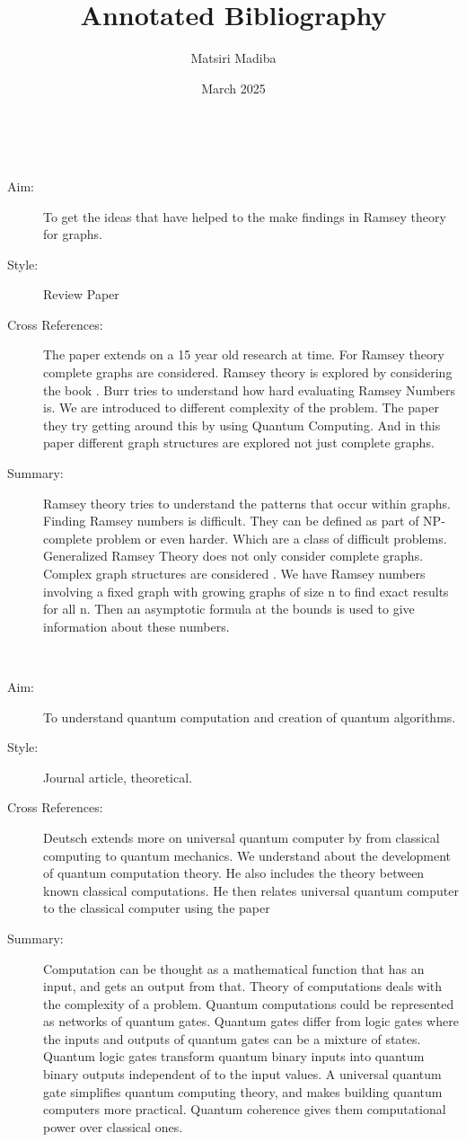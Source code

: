 \documentclass{Assignment}
\author{Matsiri Madiba}
\date{March 2025}
\title{Annotated Bibliography}
\begin{document}
\maketitle
\cite{burr1981generalized}~
\begin{description}
	\item[Aim:]
To get the ideas that have helped to the make findings in Ramsey theory for graphs.
\item[Style:]
Review Paper
\item[Cross References:]
The paper extends on a 15 year old research at time.
For Ramsey theory complete graphs are considered. 
Ramsey theory is explored by considering the book \cite{graham1980ramsey}.
Burr tries to understand how hard evaluating Ramsey Numbers is.
We are introduced to different complexity of the problem.
The paper \cite{PhysRevA.93.032301} they try getting around this by using Quantum Computing.
And in this paper different graph structures are explored not just complete graphs.
\item [Summary:]
Ramsey theory tries to understand the patterns that occur within graphs.
Finding Ramsey numbers is difficult.
They can be defined as part of NP-complete problem or even harder.
Which are a class of difficult problems.
Generalized Ramsey Theory does not only consider complete graphs.
Complex graph structures are considered .
We have Ramsey numbers involving a fixed graph with growing graphs of size n to find exact results for all n. 
Then an asymptotic formula at the bounds is used to give information about these numbers.  
\end{description}
\newpage
\cite{f3197c3a-bce3-3c72-b6d6-c1ee34ac9328}~
	    \begin{description}
			\item [ Aim:]
		To understand quantum computation and creation of quantum algorithms.
		\item[Style:]
		Journal article, theoretical.
		\item[Cross References:]
		Deutsch extends more on universal quantum computer by \cite{deutsch1985quantum} from classical computing to quantum mechanics. 
		We understand about the development of quantum computation theory.
		He also includes the theory between known classical computations. 
		He then relates universal quantum computer to the classical computer using the paper \cite{Turing1936}
		
		\item [Summary:]
		Computation can be thought as a mathematical function that has an input, and gets an output from that.
		Theory of computations deals with the complexity of a problem.
		Quantum computations could be represented as networks of quantum gates.
		Quantum gates differ from logic gates where the inputs and outputs of quantum gates can be a mixture of states.
		Quantum logic gates transform quantum binary inputs into quantum binary outputs independent of to the input values.
		A universal quantum gate simplifies quantum computing theory, and makes building quantum computers more practical. 
		Quantum coherence gives them computational power over classical ones.
	\end{description}
\end{document}
